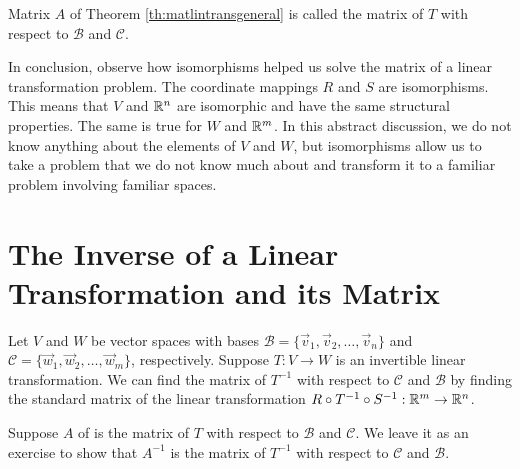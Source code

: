 \documentclass{ximera}
\begin{document}
\begin{definition}\label{def:matlintransgenera}
Matrix $A$ of Theorem \ref{th:matlintransgeneral} is called the matrix of $T$ with respect to $\mathcal{B}$ and $\mathcal{C}$.
\end{definition}

In conclusion, observe how isomorphisms helped us solve the matrix of a linear transformation problem.  The coordinate mappings $R$ and $S$ are isomorphisms.  This means that $V$ and $\mathbb{R}^n$ are isomorphic and have the same structural properties.  The same is true for $W$ and $\mathbb{R}^m$.  In this abstract discussion, we do not know anything about the elements of $V$ and $W$, but isomorphisms allow us to take a problem that we do not know much about and transform it to a familiar problem involving familiar spaces.

\section*{The Inverse of a Linear Transformation and its Matrix}

Let $V$ and $W$ be vector spaces with bases $\mathcal{B}=\{\vec{v}_1, \vec{v}_2,\ldots ,\vec{v}_n\}$ and $\mathcal{C}=\{\vec{w}_1, \vec{w}_2,\ldots ,\vec{w}_m\}$, respectively.   Suppose $T:V\rightarrow W$ is an invertible linear transformation.  We can find the matrix of $T^{-1}$ with respect to $\mathcal{C}$ and $\mathcal{B}$ by finding the standard matrix of the linear transformation $R\circ T^{-1}\circ S^{-1}:\mathbb{R}^m\rightarrow \mathbb{R}^n$.

\begin{center}
\end{center}

Suppose $A$ of  is  the matrix of $T$ with respect to $\mathcal{B}$ and $\mathcal{C}$.  We leave it as an exercise to show that $A^{-1}$ is the matrix of $T^{-1}$ with respect to $\mathcal{C}$ and $\mathcal{B}$.
\end{document}
